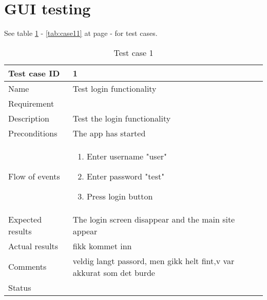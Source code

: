 
\section{GUI testing}

See table \ref{tab:case1} - \ref{tab:case11} at page \pageref{tab:case1} - \pageref{tab:case11} for test cases.
\begin{table}
\begin{tabular}{l|p{10cm}}
Test case ID & 1 \\ \hline
Name & Test login functionality\\ \hline
Requirement & \\ \hline
Description & Test the login functionality\\ \hline
Preconditions & The app has started\\ \hline
Flow of events & 
\begin{enumerate}
\item{}Enter username "user"
\item{}Enter password "test"
\item{}Press login button
\end{enumerate} \\ \hline
Expected results & The login screen disappear and the main site appear\\ \hline \hline
Actual results & fikk kommet inn\\ \hline
Comments & veldig langt passord, men gikk helt fint,v var akkurat som det burde\\ \hline
Status & 
\end{tabular}
\caption{Test case 1} \label{tab:case1}
\end{table}

